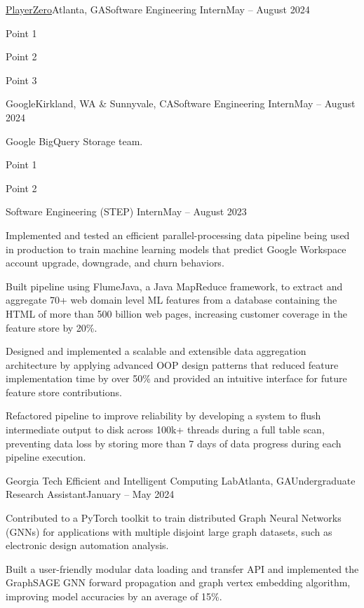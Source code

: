 \documentclass{article}
\begin{document}
\begin{flushleft}
    \begin{experience}{\href{https://www.playerzero.ai/}{PlayerZero}}{Atlanta, GA}{Software Engineering Intern}{May -- August 2024}
        \item Point 1
        \item Point 2
        \item Point 3
    \end{experience}
    \begin{experience}{Google}{Kirkland, WA \& Sunnyvale, CA}{Software Engineering Intern}{May -- August 2024}
        \item Google BigQuery Storage team.
        \item Point 1
        \item Point 2
    \end{experience}
    \begin{subexperience}{Software Engineering (STEP) Intern}{May -- August 2023}
        \item Implemented and tested an efficient parallel-processing data pipeline being used in production to train machine learning models that predict Google Workspace account upgrade, downgrade, and churn behaviors.
        \item Built pipeline using FlumeJava, a Java MapReduce framework, to extract and aggregate 70+ web domain level ML features from a database containing the HTML of more than 500 billion web pages, increasing customer coverage in the feature store by 20\%.
        \item Designed and implemented a scalable and extensible data aggregation architecture by applying advanced OOP design patterns that reduced feature implementation time by over 50\% and provided an intuitive interface for future feature store contributions.
        \item Refactored pipeline to improve reliability by developing a system to flush intermediate output to disk across 100k+ threads during a full table scan, preventing data loss by storing more than 7 days of data progress during each pipeline execution.
    \end{subexperience}

    \begin{experience}{Georgia Tech Efficient and Intelligent Computing Lab}{Atlanta, GA}{Undergraduate Research Assistant}{January -- May 2024}
        \item Contributed to a PyTorch toolkit to train distributed Graph Neural Networks (GNNs) for applications with multiple disjoint large graph datasets, such as electronic design automation analysis.
        \item Built a user-friendly modular data loading and transfer API and implemented the GraphSAGE GNN forward propagation and graph vertex embedding algorithm, improving model accuracies by an average of 15\%.
    \end{experience}


\end{flushleft}
\end{document}
